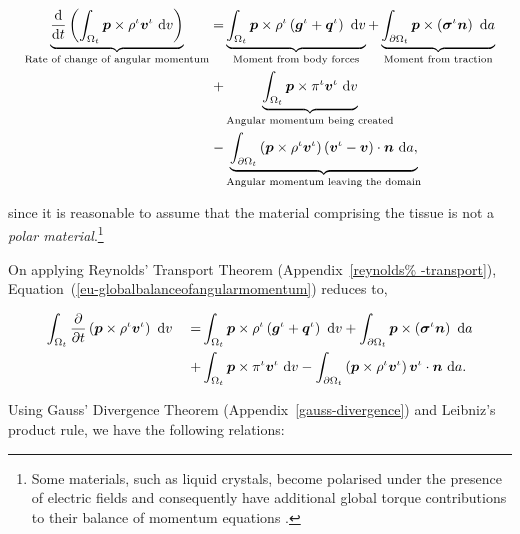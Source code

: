 \begin{equation}
\begin{split}
\underbrace{\frac{\mathrm{d}}{\mathrm{d}t}\left(\int_{\Omega_{t}} \mbox{\boldmath$ p$}
  \times \rho^{\iota} \mbox{\boldmath$ v$}^{\iota}\ \mathrm{d}v\right)}_{\text{Rate of
    change of angular momentum}} = & \underbrace{\int_{\Omega_{t}} \mbox{\boldmath$ p$}
  \times \rho^{\iota} \left(\mbox{\boldmath$ g$}^{\iota} +
  \mbox{\boldmath$ q$}^{\iota}\right)\ \mathrm{d}v}_{\text{Moment from body forces}} +
\underbrace{\int_{\partial \Omega_{t}} \mbox{\boldmath$ p$} \times
  \left(\mbox{\boldmath$\sigma$}^{\iota}\mbox{\boldmath$ n$}\right)\ \mathrm{d}a}_{\text{Moment from
    traction}}\\ + & \underbrace{\int_{\Omega_{t}} \mbox{\boldmath$ p$} \times
  \pi^{\iota}\mbox{\boldmath$ v$}^{\iota}\ \mathrm{d}v}_{\text{Angular momentum being
    created}} \\ - & \underbrace{\int_{\partial \Omega_{t}} \left(\mbox{\boldmath$ p$}
  \times \rho^{\iota} \mbox{\boldmath$ v$}^{\iota}\right) \left(\mbox{\boldmath$ v$}^{\iota} -
  \mbox{\boldmath$ v$}\right) \cdot \mbox{\boldmath$ n$}\ \mathrm{d}a,}_{\text{Angular momentum leaving
    the domain}}
\end{split}
\label{eu-globalbalanceofangularmomentum}
\end{equation}

\noindent since it is reasonable to assume that the material
comprising the tissue is not a {\em polar material}.\footnote{Some
  materials, such as liquid crystals, become polarised under the
  presence of electric fields and consequently have additional global
  torque contributions to their balance of momentum equations
  \citep{TruesdellNoll:65}.}

On applying Reynolds' Transport Theorem (Appendix~\ref{reynolds%
  -transport}), Equation~(\ref{eu-globalbalanceofangularmomentum})
reduces to,

\begin{equation*}
\begin{split}
\int_{\Omega_{t}} \frac{\partial}{\partial t}\left( \mbox{\boldmath$ p$} \times \rho^{\iota}
  \mbox{\boldmath$ v$}^{\iota}\right)\ \mathrm{d}v \quad =
& \int_{\Omega_{t}} \mbox{\boldmath$ p$} \times \rho^{\iota} \left(\mbox{\boldmath$ g$}^{\iota} +
  \mbox{\boldmath$ q$}^{\iota}\right)\ \mathrm{d}v
+ \int_{\partial \Omega_{t}}
  \mbox{\boldmath$ p$} \times \left(\mbox{\boldmath$\sigma$}^{\iota}\mbox{\boldmath$ n$}\right)\ \mathrm{d}a\\
+ & \int_{\Omega_{t}} \mbox{\boldmath$ p$} \times 
  \pi^{\iota}\mbox{\boldmath$ v$}^{\iota}\ \mathrm{d}v - \int_{\partial \Omega_{t}} \left(\mbox{\boldmath$ p$}
  \times \rho^{\iota} 
  \mbox{\boldmath$ v$}^{\iota}\right) \mbox{\boldmath$ v$}^{\iota} \cdot \mbox{\boldmath$ n$}\ \mathrm{d}a.
\end{split}
\end{equation*}

Using Gauss' Divergence Theorem (Appendix~\ref{gauss-divergence}) and
Leibniz's product rule, we have the following relations:

